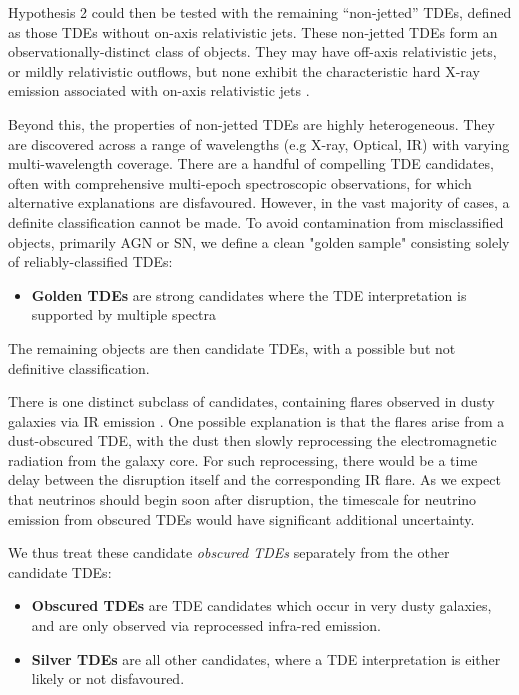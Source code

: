 Hypothesis 2 could then be tested with the remaining ``non-jetted'' TDEs, defined as those TDEs without on-axis relativistic jets. These non-jetted TDEs form an observationally-distinct class of objects. They may have off-axis relativistic jets, or mildly relativistic outflows, but none exhibit the characteristic hard X-ray emission associated with on-axis relativistic jets .

Beyond this, the properties of non-jetted TDEs are highly heterogeneous. They are discovered across a range of wavelengths (e.g X-ray, Optical, IR) with varying multi-wavelength coverage. There are a handful of compelling TDE candidates, often with comprehensive multi-epoch spectroscopic observations, for which alternative explanations are disfavoured. However, in the vast majority of cases, a definite classification cannot be made. To avoid contamination from misclassified objects, primarily AGN or SN, we define a clean "golden sample" consisting solely of reliably-classified TDEs:

\begin{itemize}
	\item \textbf{Golden TDEs} are strong candidates where the TDE interpretation is supported by multiple spectra
\end{itemize}

The remaining objects are then candidate TDEs, with a possible but not definitive classification. 

There is one distinct subclass of candidates, containing flares observed in dusty galaxies via IR emission . One possible explanation is that the flares arise from a dust-obscured TDE, with the dust then slowly reprocessing the electromagnetic radiation from the galaxy core.  For such reprocessing, there would be a time delay between the disruption itself and the corresponding IR flare. As we expect that neutrinos should begin soon after disruption, the timescale for neutrino emission from obscured TDEs would have significant additional uncertainty. 

We thus treat these candidate \emph{obscured TDEs} separately from the other candidate TDEs:

\begin{itemize}
		\item \textbf{Obscured TDEs} are TDE candidates which occur in very dusty galaxies, and are only observed via reprocessed infra-red emission. 
	\item \textbf{Silver TDEs} are all other candidates, where a TDE interpretation is either likely or not disfavoured.
\end{itemize}

